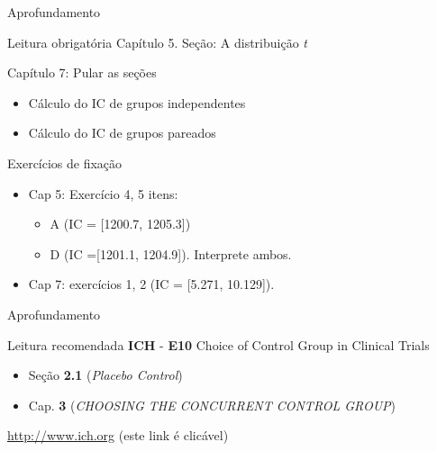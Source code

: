 \documentclass{beamer}
\begin{document}
\begin{frame}{Aprofundamento}
  \small
  \begin{block}{Leitura obrigatória}
    Capítulo 5. Seção: A distribuição {\em t}

    Capítulo 7: Pular as seções
    \begin{itemize}
    \item Cálculo do IC de grupos independentes
    \item Cálculo do IC de grupos pareados
    \end{itemize}
  \end{block}
  \begin{block}{Exercícios de fixação}
  \footnotesize
    \begin{itemize}
    \item Cap 5: Exercício 4, 5 itens:
      \begin{itemize}
        \footnotesize
      \item A (IC = [1200.7, 1205.3])
      \item D (IC =[1201.1, 1204.9]). Interprete ambos.
      \end{itemize}
    \item Cap 7: exercícios 1, 2 (IC = [5.271, 10.129]).
    \end{itemize}
  \end{block}
\end{frame}

\begin{frame}{Aprofundamento}
  \begin{block}{Leitura recomendada}
    {\bf ICH} - {\bf E10} Choice of Control Group in Clinical Trials
    \begin{itemize}
    \item Seção {\bf 2.1} ({\em\footnotesize Placebo Control})
    \item Cap. {\bf 3} ({\em\footnotesize CHOOSING THE CONCURRENT CONTROL GROUP})
    \end{itemize}

    \bigskip
    \href{http://www.ich.org/products/guidelines/efficacy/efficacy-single/article/choice-of-control-group-and-related-issues-in-clinical-trials.html}{http://www.ich.org} {\tiny (este link é clicável)}
  \end{block}  
\end{frame}
\end{document}
